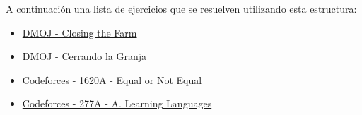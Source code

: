 A continuación una lista de ejercicios que se resuelven utilizando esta estructura:

\begin{itemize}
	\item \href{https://dmoj.uclv.edu.cu/problem/closing}{DMOJ - Closing the Farm} 
	\item \href{https://dmoj.uclv.edu.cu/problem/cerrando} {DMOJ - Cerrando la Granja}
	\item \href{https://codeforces.com/problemset/problem/1620/A} {Codeforces - 1620A - Equal or Not Equal}
	\item \href{https://codeforces.com/contest/277/problem/A} {Codeforces - 277A - A. Learning Languages}
\end{itemize}